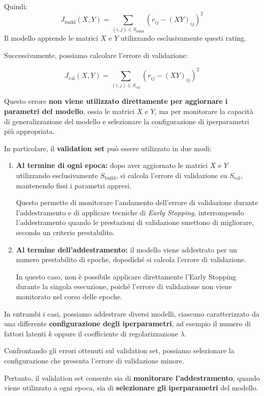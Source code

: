 Quindi:
\[
\boxed{
J_{\text{build}}(X,Y)=
\sum_{(i,j)\in S_{\text{build}}}
(r_{ij}-(XY)_{ij})^2
}
\]
Il modello apprende le matrici \(X\) e \(Y\) utilizzando esclusivamente questi rating.

Successivamente, possiamo calcolare l'errore di validazione:

\[
J_{\text{val}}(X,Y)=
\sum_{(i,j)\in S_{\text{val}}}
(r_{ij}-(XY)_{ij})^2
\]

Questo errore \textbf{non viene utilizzato direttamente per aggiornare
i parametri del modello}, ossia le matrici $X$ e $Y$, ma per
monitorare la capacità di generalizzazione del modello e
selezionare la configurazione di iperparametri più appropriata.

In particolare, il \textbf{validation set} può essere utilizzato
in due modi:

\begin{enumerate}
    \item \textbf{Al termine di ogni epoca:}
    dopo aver aggiornato le matrici $X$ e $Y$ utilizzando
    esclusivamente $S_{\text{build}}$, si calcola l'errore
    di validazione su $S_{\text{val}}$, mantenendo fissi
    i parametri appresi.

    Questo permette di monitorare l'andamento dell'errore
    di validazione durante l'addestramento e di applicare
    tecniche di \textit{Early Stopping}, interrompendo
    l'addestramento quando le prestazioni di validazione
    smettono di migliorare, secondo un criterio prestabilito.

    \item \textbf{Al termine dell'addestramento:}
    il modello viene addestrato per un numero prestabilito
    di epoche, dopodiché si calcola l'errore di validazione.

    In questo caso, non è possibile applicare direttamente
    l'Early Stopping durante la singola esecuzione,
    poiché l'errore di validazione non viene monitorato
    nel corso delle epoche.
\end{enumerate}

In entrambi i casi, possiamo addestrare diversi modelli,
ciascuno caratterizzato da una differente
\textbf{configurazione degli iperparametri}, ad esempio
il numero di fattori latenti $k$ oppure il coefficiente
di regolarizzazione $\lambda$.

Confrontando gli errori ottenuti sul validation set,
possiamo selezionare la configurazione che presenta
l'errore di validazione minore.

Pertanto, il validation set consente sia di
\textbf{monitorare l'addestramento}, quando viene utilizzato
a ogni epoca, sia di \textbf{selezionare gli iperparametri}
del modello.

